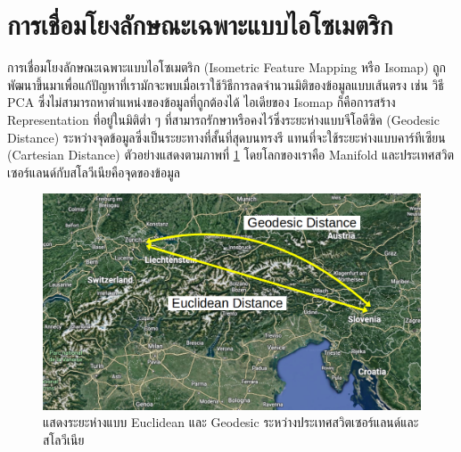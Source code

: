 \section{การเชื่อมโยงลักษณะเฉพาะแบบไอโซเมตริก}
\label{sec:isomap}

การเชื่อมโยงลักษณะเฉพาะแบบไอโซเมตริก (Isometric Feature Mapping หรือ Isomap)\autocite{tenenbaum2000} ถูกพัฒนาขึ้นมาเพื่อแก้ปัญหาที่เรามักจะพบเมื่อเราใช้วิธีการลดจำนวนมิติของข้อมูลแบบเส้นตรง เช่น วิธี PCA ซึ่งไม่สามารถหาตำแหน่งของข้อมูลที่ถูกต้องได้ ไอเดียของ Isomap ก็คือการสร้าง Representation ที่อยู่ในมิติต่ำ ๆ ที่สามารถรักษาหรือคงไว้ซึ่งระยะห่างแบบจีโอดีซิค (Geodesic Distance) ระหว่างจุดข้อมูลซึ่งเป็นระยะทางที่สั้นที่สุดบนทรงรี แทนที่จะใช้ระยะห่างแบบคาร์ทีเซียน (Cartesian Distance) ตัวอย่างแสดงตามภาพที่ \ref{fig:map_geodesic_euclidean} โดยโลกของเราคือ Manifold และประเทศสวิตเซอร์แลนด์กับสโลวีเนียคือจุดของข้อมูล

\begin{figure}[H]
    \centering
    \includegraphics[width=0.75\linewidth]{fig/map_geodesic_euclidean.png}
    \caption{แสดงระยะห่างแบบ Euclidean และ Geodesic ระหว่างประเทศสวิตเซอร์แลนด์และสโลวีเนีย}
    \label{fig:map_geodesic_euclidean}
\end{figure}

